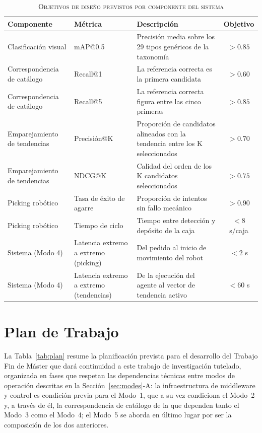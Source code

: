 \documentclass[conference]{IEEEtran}
\begin{document}
\begin{table}[!t]
\caption{\textsc{Objetivos de diseño previstos por componente del sistema}}
\label{tab:metrics}
\centering
\footnotesize
\begin{tabular}{@{}llp{7.5cm}c@{}}
\toprule
\textbf{Componente} & \textbf{Métrica} & \textbf{Descripción} & \textbf{Objetivo} \\
\midrule
Clasificación visual & mAP@0.5 & Precisión media sobre los 29 tipos genéricos de la taxonomía & $> 0.85$ \\
Correspondencia de catálogo & Recall@1 & La referencia correcta es la primera candidata & $> 0.60$ \\
Correspondencia de catálogo & Recall@5 & La referencia correcta figura entre las cinco primeras & $> 0.85$ \\
Emparejamiento de tendencias & Precisión@K & Proporción de candidatos alineados con la tendencia entre los K seleccionados & $> 0.70$ \\
Emparejamiento de tendencias & NDCG@K & Calidad del orden de los K candidatos seleccionados & $> 0.75$ \\
Picking robótico & Tasa de éxito de agarre & Proporción de intentos sin fallo mecánico & $> 0.90$ \\
Picking robótico & Tiempo de ciclo & Tiempo entre detección y depósito de la caja & $< 8$ s/caja \\
Sistema (Modo 4) & Latencia extremo a extremo (picking) & Del pedido al inicio de movimiento del robot & $< 2$ s \\
Sistema (Modo 4) & Latencia extremo a extremo (tendencias) & De la ejecución del agente al vector de tendencia activo & $< 60$ s \\
\bottomrule
\end{tabular}
\end{table}

\section{Plan de Trabajo}
\label{sec:plan}

La Tabla~\ref{tab:plan} resume la planificación prevista para el desarrollo
del Trabajo Fin de Máster que dará continuidad a este trabajo de
investigación tutelado, organizada en fases que respetan las dependencias
técnicas entre modos de operación descritas en la
Sección~\ref{sec:modes}-A: la infraestructura de middleware y control es
condición previa para el Modo~1, que a su vez condiciona el Modo~2 y, a
través de él, la correspondencia de catálogo de la que dependen tanto el
Modo~3 como el Modo~4; el Modo~5 se aborda en último lugar por ser la
composición de los dos anteriores.
\end{document}
